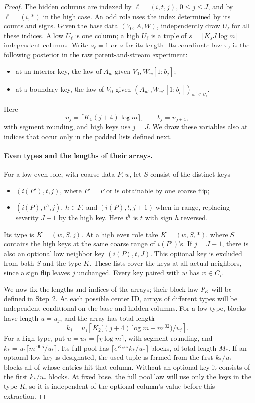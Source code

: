 \begin{proof}
The hidden columns are indexed by
\(\ell=(i,t,j)\), \(0\le j\le J\), and by \(\ell=(i,*)\) in the
high case. An odd role uses the index determined by its counts and signs.
Given the base data \((V_0,A,W)\), independently draw \(U_\ell\) for
all these indices. A low \(U_\ell\) is one column; a high \(U_\ell\)
is a tuple of \(s=\lceil K_sJ\log m\rceil\) independent columns.
Write \(s_\ell=1\) or \(s\) for its length. Its coordinate law
\(\pi_\ell\) is the following posterior in the raw parent-and-stream
experiment:
\begin{itemize}
\item at an interior key, the law of \(A_w\) given
\(V_0,W_w[1:b_j]\);
\item at a boundary key, the law of \(V_0\) given
\((A_{w'},W_{w'}[1:b_j])_{w'\in C_i}\).
\end{itemize}
Here
\[
 u_j=\lceil K_1(j+4)\log m\rceil,\qquad b_j=u_{j+1},
\]
with segment rounding, and high keys use \(j=J\). We draw these variables
also at indices that occur only in the padded lists defined next.

\paragraph{Even types and the lengths of their arrays.}
For a low even role, with coarse data \(P,w\), let \(S\) consist of the
distinct keys
\begin{itemize}
\item \((i(P'),t,j)\), where \(P'=P\) or is obtainable by one coarse
flip;
\item \((i(P),t^h,j)\), \(h\in F\), and
\((i(P),t,j\pm1)\) when in range, replacing severity \(J+1\) by the
high key. Here \(t^h\) is \(t\) with sign \(h\) reversed.
\end{itemize}
Its type is \(K=(w,S,j)\). At a high even role take
\(K=(w,S,*)\), where \(S\) contains the high keys at the same coarse
range of \(i(P')\)'s. If \(j=J+1\), there is also an optional low
neighbor key \((i(P),t,J)\). This optional key is excluded from both
\(S\) and the type \(K\). These lists cover the keys at all actual
neighbors, since a sign flip leaves \(j\) unchanged. Every key paired
with \(w\) has \(w\in C_i\).

We now fix the lengths and indices of the arrays; their block law
\(P_K\) will be defined in Step~2. At each possible center ID, arrays of
different types will be independent conditional on the base and hidden
columns. For a low type, blocks have length \(u=u_j\), and the array
has total length
\[
 k_j=u_j\left\lceil K_2\big((j+4)\log m+m^{.02}\big)/u_j\right\rceil.
\]
For a high type, put \(u=u_*=\lceil\eta\log m\rceil\), with segment
rounding, and \(k_*=u_*\lceil m^{.005}/u_*\rceil\). Its full pool has
\(\lceil e^{K_hu_*}k_*/u_*\rceil\) blocks, of total length \(M_*\).
If an optional low key is designated, the used tuple is formed from the
first \(k_*/u_*\) blocks all of whose entries hit that column. Without
an optional key it consists of the first \(k_*/u_*\) blocks. At fixed base, the full
pool law will use only the keys in the type \(K\), so it is independent
of the optional column's value before this extraction.


\end{proof}
